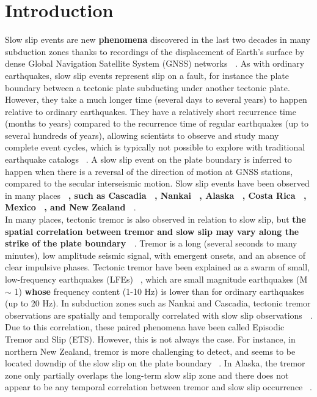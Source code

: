 \documentclass{article}
\begin{document}
\section{Introduction}

Slow slip events are new \textbf{phenomena} discovered in the last two decades in many subduction zones thanks to recordings of the displacement of Earth's surface by dense Global Navigation Satellite System (GNSS) networks \textbf{~\citep{VER_2010,SCH_2010,JIA_2012,WAL_2012}}. As with ordinary earthquakes, slow slip events represent slip on a fault, for instance the plate boundary between a tectonic plate subducting under another tectonic plate. However, they take a much longer time (several days to several years) to happen relative to ordinary earthquakes. They have a relatively short recurrence time (months to years) compared to the recurrence time of regular earthquakes (up to several hundreds of years), allowing scientists to observe and study many complete event cycles, which is typically not possible to explore with traditional earthquake catalogs ~\citep{BER_2011}. A slow slip event on the plate boundary is inferred to happen when there is a reversal of the direction of motion at GNSS stations, compared to the secular interseismic motion. Slow slip events have been observed in many places \textbf{~\citep{BER_2011,AUD_2016}, such as Cascadia ~\citep{BAR_2020}, Nankai ~\citep{NIS_2013}, Alaska ~\citep{LI_2016}, Costa Rica ~\citep{JIA_2012}, Mexico ~\citep{RAD_2012}, and New Zealand ~\citep{WAL_2020}}. \\

In many places, tectonic tremor is also observed in relation to slow slip, but \textbf{the spatial correlation between tremor and slow slip may vary along the strike of the plate boundary ~\citep{HAL_2018}}. Tremor is a long (several seconds to many minutes), low amplitude seismic signal, with emergent onsets, and an absence of clear impulsive phases. Tectonic tremor have been explained as a swarm of small, low-frequency earthquakes (LFEs) ~\citep{SHE_2007_nature}, which are small magnitude earthquakes (M $\sim$ 1) \textbf{whose} frequency content (1-10 Hz) is lower than for ordinary earthquakes (up to 20 Hz). In subduction zones such as Nankai and Cascadia, tectonic tremor observations are spatially and temporally correlated with slow slip observations \textbf{~\citep{ROG_2003,OBA_2004}}. Due to this correlation, these paired phenomena have been called Episodic Tremor and Slip (ETS). However, this is not always the case. For instance, in northern New Zealand, tremor is more challenging to detect, and seems to be located downdip of the slow slip on the plate boundary ~\citep{TOD_2016}. In Alaska, the tremor zone only partially overlaps the long-term slow slip zone and there does not appear to be any temporal correlation between tremor and slow slip occurrence ~\citep{WEC_2016}. \\
\end{document}

